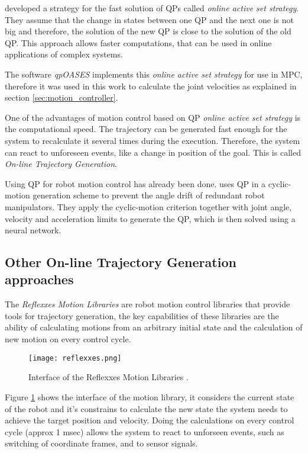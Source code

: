\citet{qp_algorithm} developed a strategy for the fast solution of QPs called \textit{online active set strategy}. They assume that the change in states between one QP and the next one is not big and therefore, the solution of the new QP is close to the solution of the old QP. This approach allows faster computations, that can be used in online applications of complex systems.
 
The software \textit{qpOASES} implements this \textit{online active set strategy} for use in MPC, therefore it was used in this work to calculate the joint velocities as explained in section \ref{sec:motion_controller}.

One of the advantages of motion control based on QP \textit{online active set strategy} is the computational speed. The trajectory can be generated fast enough for the system to recalculate it several times during the execution. Therefore, the system can react to unforeseen events, like a change in position of the goal. This is called \textit{On-line Trajectory Generation}.

Using QP for robot motion control has already been done. \cite{acc_level_control} uses QP in a cyclic-motion generation scheme to prevent the angle drift of redundant robot manipulators. They apply the cyclic-motion criterion together with joint angle, velocity and acceleration limits to generate the QP, which is then solved using a neural network.

\subsection{Other On-line Trajectory Generation approaches}

The \textit{Reflexxes Motion Libraries} \citep{reflexxes_lib} are robot motion control libraries that provide tools for trajectory generation, the key capabilities of these libraries are the ability of calculating motions from an arbitrary initial state and the calculation of new motion on every control cycle.

\begin{figure}[H]
	\centering
	\texttt{[image: reflexxes.png]}
	\vspace{-10pt}
	\caption[Reflexxes]{Interface of the Reflexxes Motion Libraries \citep[page 1]{reflexxes_lib}.}
	\vspace{-15pt}
	\label{fig:reflex}
\end{figure}

Figure \ref{fig:reflex} shows the interface of the motion library, it considers the current state of the robot and it's constrains to calculate the new state the system needs to achieve the target position and velocity. Doing the calculations on every control cycle (approx 1 msec) allows the system to react to unforseen events, such as switching of coordinate frames, and to sensor signals.

